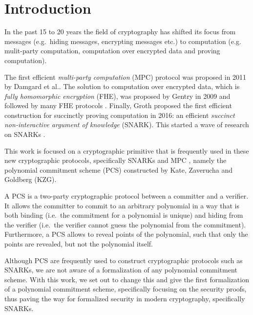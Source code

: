 
\chapter{Introduction}\label{chapter:introduction}
In the past 15 to 20 years the field of cryptography has shifted its focus from messages (e.g.\ hiding messages, encrypting messages etc.) to computation (e.g. mulit-party computation, computation over encrypted data and proving computation). 

The first efficient \textit{multi-party computation} (MPC) protocol was proposed in 2011 by Damgard et al.\parencite{SPDZ}. The solution to computation over encrypted data, which is \textit{fully homomorphic encryption} (FHE), was proposed by Gentry in 2009 \parencite{fhe} and followed by many FHE protocols \parencite{CKKS,TFHE,BGV,BFV}.
Finally, Groth proposed the first efficient construction for succinctly proving computation in 2016: an efficient \textit{succinct non-interactive argument of knowledge} (SNARK). This started a wave of research on SNARKs \parencite{thalerbook,Groth16,Bulletproofs,marlin,sonic,plonk,halo,nova,ProtoStar}.

This work is focused on a cryptographic primitive that is frequently used in these new cryptographic protocols, specifically SNARKs\parencite{plonk,sonic,marlin,halo} and MPC \parencite{PCS_MPC,BDOZ, VSS_MPC, KZG}, namely the polynomial commitment scheme (PCS) constructed by Kate, Zaverucha and Goldberg (KZG)\parencite{KZG}.

A PCS is a two-party cryptographic protocol between a committer and a verifier. It allows the committer to commit to an arbitrary polynomial in a way that is both binding (i.e.\ the commitment for a polynomial is unique) and hiding from the verifier (i.e.\ the verifier cannot guess the polynomial from the commitment). Furthermore, a PCS allows to reveal points of the polynomial, such that only the points are revealed, but not the polynomial itself. 

Although PCS are frequently used to construct cryptographic protocols such as SNARKs, we are not aware of a formalization of any polynomial commitment scheme. With this work, we set out to change this and give the first formalization of a polynomial commitment scheme, specifically focusing on the security proofs, thus paving the way for formalized security in modern cryptography, specifically SNARKs.

